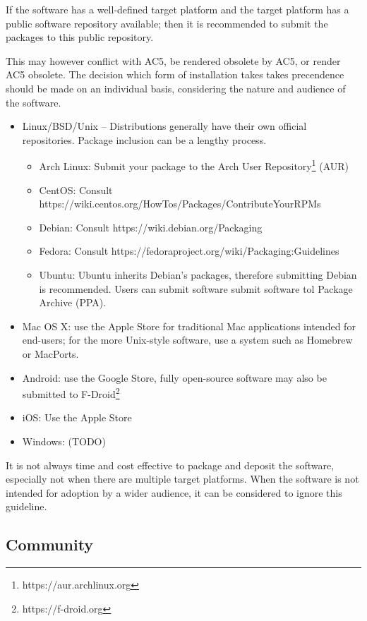 \documentclass[a4paper,11pt]{article}
\begin{document}
If the software has a well-defined target platform and the target platform has
a public software repository available; then it is recommended to submit the
packages to this public repository.

This may however conflict with AC5, be rendered obsolete by AC5, or render AC5
obsolete. The decision which form of installation takes takes precendence should be
made on an individual basis, considering the nature and audience of the
software.

\begin{itemize}
    \item Linux/BSD/Unix -- Distributions generally have their own official repositories. Package inclusion can be a lengthy process.
    \begin{itemize}
        \item Arch Linux: Submit your package to the Arch User Repository\footnote{https://aur.archlinux.org} (AUR)
		\item CentOS: Consult https://wiki.centos.org/HowTos/Packages/ContributeYourRPMs
        \item Debian: Consult https://wiki.debian.org/Packaging
        \item Fedora: Consult https://fedoraproject.org/wiki/Packaging:Guidelines
        \item Ubuntu: Ubuntu inherits Debian's packages, therefore submitting Debian is recommended. Users can submit software submit software tol Package Archive (PPA).
    \end{itemize}
    \item Mac OS X: use the Apple Store for traditional Mac applications intended for end-users; for the more Unix-style
        software, use a system such as Homebrew or MacPorts.
    \item Android: use the Google Store, fully open-source software may also be submitted to F-Droid\footnote{https://f-droid.org}
    \item iOS: Use the Apple Store
    \item Windows: (TODO) 
\end{itemize}

It is not always time and cost effective to package and deposit the software,
especially not when there are multiple target platforms. When the software is
not intended for adoption by a wider audience, it can be considered to ignore
this guideline.

\subsection{Community}
\end{document}
